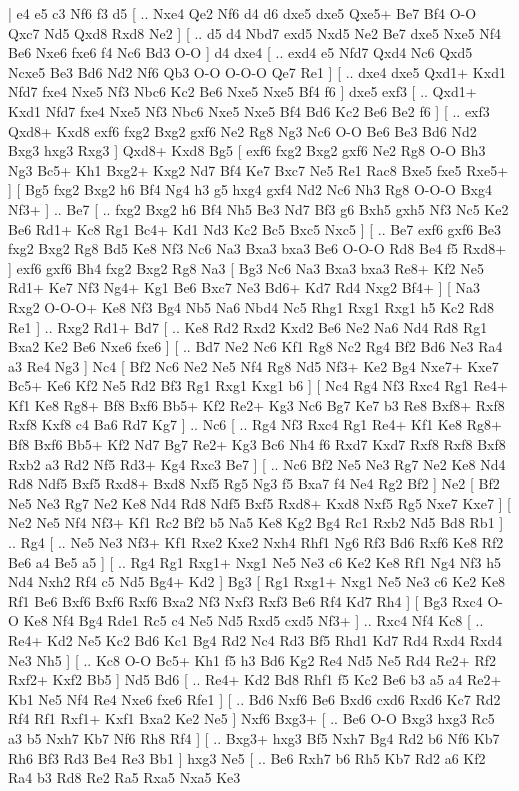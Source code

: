 \makegametitle 
|   e4   e5    c3   Nf6    f3   d5 [ .. Nxe4  Qe2 Nf6  d4 d6  dxe5 dxe5  Qxe5+ Be7  Bf4 O-O  Qxc7 Nd5  Qxd8 Rxd8  Ne2   ]  [ .. d5  d4 Nbd7  exd5 Nxd5  Ne2 Be7  dxe5 Nxe5  Nf4 Be6  Nxe6 fxe6  f4 Nc6  Bd3 O-O   ]  d4   dxe4 [ .. exd4  e5 Nfd7  Qxd4 Nc6  Qxd5 Ncxe5  Be3 Bd6  Nd2 Nf6  Qb3 O-O  O-O-O Qe7  Re1   ]  [ .. dxe4  dxe5 Qxd1+  Kxd1 Nfd7  fxe4 Nxe5  Nf3 Nbc6  Kc2 Be6  Nxe5 Nxe5  Bf4 f6   ]  dxe5   exf3 [ .. Qxd1+  Kxd1 Nfd7  fxe4 Nxe5  Nf3 Nbc6  Nxe5 Nxe5  Bf4 Bd6  Kc2 Be6  Be2 f6   ]  [ .. exf3  Qxd8+ Kxd8  exf6 fxg2  Bxg2 gxf6  Ne2 Rg8  Ng3 Nc6  O-O Be6  Be3 Bd6  Nd2 Bxg3  hxg3 Rxg3   ]  Qxd8+   Kxd8   Bg5 [  exf6 fxg2  Bxg2 gxf6  Ne2 Rg8  O-O Bh3  Ng3 Bc5+  Kh1 Bxg2+  Kxg2 Nd7  Bf4 Ke7  Bxc7 Ne5  Re1 Rac8  Bxe5 fxe5  Rxe5+   ]  [  Bg5 fxg2  Bxg2 h6  Bf4 Ng4  h3 g5  hxg4 gxf4  Nd2 Nc6  Nh3 Rg8  O-O-O Bxg4  Nf3+   ] .. Be7 [ .. fxg2  Bxg2 h6  Bf4 Nh5  Be3 Nd7  Bf3 g6  Bxh5 gxh5  Nf3 Nc5  Ke2 Be6  Rd1+ Kc8  Rg1 Bc4+  Kd1 Nd3  Kc2 Bc5  Bxc5 Nxc5   ]  [ .. Be7  exf6 gxf6  Be3 fxg2  Bxg2 Rg8  Bd5 Ke8  Nf3 Nc6  Na3 Bxa3  bxa3 Be6  O-O-O Rd8  Be4 f5  Rxd8+   ]  exf6   gxf6    Bh4   fxg2    Bxg2   Rg8    Na3 [  Bg3 Nc6  Na3 Bxa3  bxa3 Re8+  Kf2 Ne5  Rd1+ Ke7  Nf3 Ng4+  Kg1 Be6  Bxc7 Ne3  Bd6+ Kd7  Rd4 Nxg2  Bf4+   ]  [  Na3 Rxg2  O-O-O+ Ke8  Nf3 Bg4  Nb5 Na6  Nbd4 Nc5  Rhg1 Rxg1  Rxg1 h5  Kc2 Rd8  Re1   ] .. Rxg2    Rd1+   Bd7 [ .. Ke8  Rd2 Rxd2  Kxd2 Be6  Ne2 Na6  Nd4 Rd8  Rg1 Bxa2  Ke2 Be6  Nxe6 fxe6   ]  [ .. Bd7  Ne2 Nc6  Kf1 Rg8  Nc2 Rg4  Bf2 Bd6  Ne3 Ra4  a3 Re4  Ng3   ]  Nc4 [  Bf2 Nc6  Ne2 Ne5  Nf4 Rg8  Nd5 Nf3+  Ke2 Bg4  Nxe7+ Kxe7  Bc5+ Ke6  Kf2 Ne5  Rd2 Bf3  Rg1 Rxg1  Kxg1 b6   ]  [  Nc4 Rg4  Nf3 Rxc4  Rg1 Re4+  Kf1 Ke8  Rg8+ Bf8  Bxf6 Bb5+  Kf2 Re2+  Kg3 Nc6  Bg7 Ke7  b3 Re8  Bxf8+ Rxf8  Rxf8 Kxf8  c4 Ba6  Rd7 Kg7   ] .. Nc6 [ .. Rg4  Nf3 Rxc4  Rg1 Re4+  Kf1 Ke8  Rg8+ Bf8  Bxf6 Bb5+  Kf2 Nd7  Bg7 Re2+  Kg3 Bc6  Nh4 f6  Rxd7 Kxd7  Rxf8 Rxf8  Bxf8 Rxb2  a3 Rd2  Nf5 Rd3+  Kg4 Rxc3  Be7   ]  [ .. Nc6  Bf2 Ne5  Ne3 Rg7  Ne2 Ke8  Nd4 Rd8  Ndf5 Bxf5  Rxd8+ Bxd8  Nxf5 Rg5  Ng3 f5  Bxa7 f4  Ne4 Rg2  Bf2   ]  Ne2 [  Bf2 Ne5  Ne3 Rg7  Ne2 Ke8  Nd4 Rd8  Ndf5 Bxf5  Rxd8+ Kxd8  Nxf5 Rg5  Nxe7 Kxe7   ]  [  Ne2 Ne5  Nf4 Nf3+  Kf1 Rc2  Bf2 b5  Na5 Ke8  Kg2 Bg4  Rc1 Rxb2  Nd5 Bd8  Rb1   ] .. Rg4 [ .. Ne5  Ne3 Nf3+  Kf1 Rxe2  Kxe2 Nxh4  Rhf1 Ng6  Rf3 Bd6  Rxf6 Ke8  Rf2 Be6  a4 Be5  a5   ]  [ .. Rg4  Rg1 Rxg1+  Nxg1 Ne5  Ne3 c6  Ke2 Ke8  Rf1 Ng4  Nf3 h5  Nd4 Nxh2  Rf4 c5  Nd5 Bg4+  Kd2   ]  Bg3 [  Rg1 Rxg1+  Nxg1 Ne5  Ne3 c6  Ke2 Ke8  Rf1 Be6  Bxf6 Bxf6  Rxf6 Bxa2  Nf3 Nxf3  Rxf3 Be6  Rf4 Kd7  Rh4   ]  [  Bg3 Rxc4  O-O Ke8  Nf4 Bg4  Rde1 Rc5  c4 Ne5  Nd5 Rxd5  cxd5 Nf3+   ] .. Rxc4    Nf4   Kc8 [ .. Re4+  Kd2 Ne5  Kc2 Bd6  Kc1 Bg4  Rd2 Nc4  Rd3 Bf5  Rhd1 Kd7  Rd4 Rxd4  Rxd4 Ne3  Nh5   ]  [ .. Kc8  O-O Bc5+  Kh1 f5  h3 Bd6  Kg2 Re4  Nd5 Ne5  Rd4 Re2+  Rf2 Rxf2+  Kxf2 Bb5   ]  Nd5   Bd6 [ .. Re4+  Kd2 Bd8  Rhf1 f5  Kc2 Be6  b3 a5  a4 Re2+  Kb1 Ne5  Nf4 Re4  Nxe6 fxe6  Rfe1   ]  [ .. Bd6  Nxf6 Be6  Bxd6 cxd6  Rxd6 Kc7  Rd2 Rf4  Rf1 Rxf1+  Kxf1 Bxa2  Ke2 Ne5   ]  Nxf6   Bxg3+ [ .. Be6  O-O Bxg3  hxg3 Rc5  a3 b5  Nxh7 Kb7  Nf6 Rh8  Rf4   ]  [ .. Bxg3+  hxg3 Bf5  Nxh7 Bg4  Rd2 b6  Nf6 Kb7  Rh6 Bf3  Rd3 Be4  Re3 Bb1   ]  hxg3   Ne5 [ .. Be6  Rxh7 b6  Rh5 Kb7  Rd2 a6  Kf2 Ra4  b3 Rd8  Re2 Ra5  Rxa5 Nxa5  Ke3 